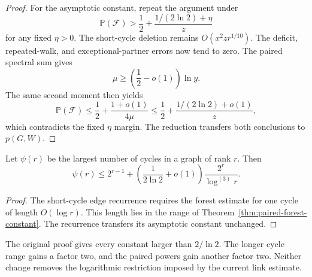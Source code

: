 \begin{proof}
For the asymptotic constant, repeat the argument under
\[
 \mathbb P(\mathcal F)>\frac12+
 \frac{1/(2\ln2)+\eta}{z}
\]
for any fixed $\eta>0$.
The short-cycle deletion remains $O(x^2z r^{1/10})$.
The deficit, repeated-walk, and exceptional-partner errors now tend to zero.
The paired spectral sum gives
\[
 \mu\ge\left(\frac12-o(1)\right)\ln y.
\]
The same second moment then yields
\[
 \mathbb P(\mathcal F)
 \le\frac12+\frac{1+o(1)}{4\mu}
 \le\frac12+\frac{1/(2\ln2)+o(1)}{z},
\]
which contradicts the fixed $\eta$ margin.
The reduction transfers both conclusions to $p(G,W)$.
\end{proof}

\begin{corollary}
\label{cor:paired-cycle-constant}
Let $\psi(r)$ be the largest number of cycles in a graph of rank $r$.
Then
\[
 \psi(r)\le2^{r-1}+
 \left(\frac1{2\ln2}+o(1)\right)
 \frac{2^r}{\log^{(3)}r}.
\]
\end{corollary}

\begin{proof}
The short-cycle edge recurrence requires the forest estimate for one cycle of length $O(\log r)$.
This length lies in the range of Theorem~\ref{thm:paired-forest-constant}.
The recurrence transfers its asymptotic constant unchanged.
\end{proof}

The original proof gives every constant larger than $2/\ln2$.
The longer cycle range gains a factor two, and the paired powers gain another factor two.
Neither change removes the logarithmic restriction imposed by the current link estimate.
